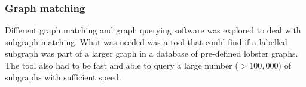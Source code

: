 \subsubsection{Graph matching}
Different graph matching and graph querying software was explored to deal with subgraph matching. What was needed was a tool that could find if a labelled subgraph was part of a larger graph in a database of pre-defined lobster graphs. The tool also had to be fast and able to query a large number ($> 100,000$) of subgraphs with sufficient speed. 
\cite{graphgrep} \cite{appagato}